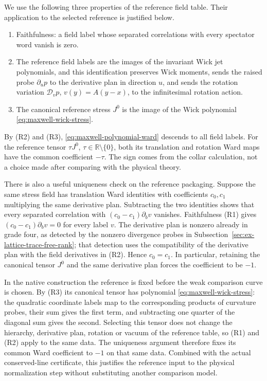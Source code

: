 We use the following three properties of the reference field table.
Their application to the selected reference is justified below.
\begin{enumerate}
\item[(R1)] Faithfulness: a field label whose separated correlations with
  every spectator word vanish is zero.
\item[(R2)] The reference field labels are the images of the invariant
  Wick jet polynomials, and this identification preserves Wick moments,
  sends the raised probe $\partial_up$ to the derivative plan in direction
  $u$, and sends the rotation variation $\mathscr D_vp$, $v(y)=A(y-x)$, to
  the infinitesimal rotation action.
\item[(R3)] The canonical reference stress $J^0$ is the image of the Wick
  polynomial \eqref{eq:maxwell-wick-stress}.
\end{enumerate}
By (R2) and (R3), \eqref{eq:maxwell-polynomial-ward} descends to all field
labels. For the reference tensor $\tau J^0$, $\tau\in\mathbb R
\setminus\{0\}$, both its translation and rotation Ward maps have
the common coefficient $-\tau$. The sign comes from the collar
calculation, not a choice made after comparing with the physical theory.

There is also a useful uniqueness check on the reference packaging.
Suppose the same stress field has translation Ward identities with
coefficients $c_0,c_1$ multiplying the same derivative plan. Subtracting
the two identities shows that every separated correlation with
$(c_0-c_1)\partial_bv$ vanishes. Faithfulness (R1)
gives $(c_0-c_1)\partial_bv=0$ for every label $v$. The derivative
plan is nonzero already in grade four, as detected by the nonzero
divergence probes in Subsection~\ref{sec:ex-lattice-trace-free-rank}; that
detection uses the compatibility of the derivative plan with the field
derivatives in (R2).
Hence $c_0=c_1$. In particular, retaining the canonical tensor $J^0$
and the same derivative plan forces the coefficient to be $-1$.

In the native construction the reference is fixed before the weak
comparison curve is chosen. By (R3) its canonical tensor has polynomial
\eqref{eq:maxwell-wick-stress}: the quadratic coordinate labels map
to the corresponding products of curvature probes, their sum gives
the first term, and subtracting one quarter of the diagonal sum
gives the second. Selecting this tensor does not change the
hierarchy, derivative plan, rotation or vacuum of the reference table, so
(R1) and (R2) apply to the same data.
The uniqueness argument therefore fixes its common Ward coefficient
to $-1$ on that same data. Combined with the actual conserved-line
certificate, this justifies the reference input to the physical
normalization step without substituting another comparison model.

